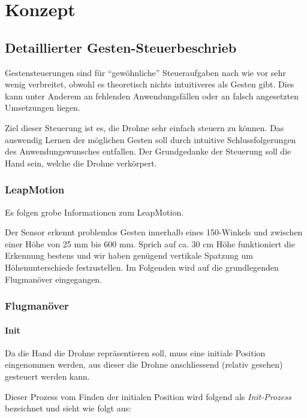 \chapter{Konzept}

\section{Detaillierter Gesten-Steuerbeschrieb}

Gestensteuerungen sind für "`gewöhnliche"' Steueraufgaben nach wie vor sehr wenig verbreitet, obwohl es theoretisch nichts intuitiveres als Gesten gibt.
Dies kann unter Anderem an fehlenden Anwendungsfällen oder an falsch angesetzten Umsetzungen liegen.

Ziel dieser Steuerung ist es, die Drohne sehr einfach steuern zu können.
Das auswendig Lernen der möglichen Gesten soll durch intuitive Schlussfolgerungen des Anwendungswunsches entfallen.
Der Grundgedanke der Steuerung soll die Hand sein, welche die Drohne verkörpert.

\subsection{LeapMotion}
Es folgen grobe Informationen zum LeapMotion.

Der Sensor erkennt problemlos Gesten innerhalb eines 150\textdegree-Winkels und zwischen einer Höhe von 25 mm bis 600 mm.
Sprich auf ca. 30 cm Höhe funktioniert die Erkennung bestens und wir haben genügend vertikale Spatzung um Höhenunterschiede festzustellen.
Im Folgenden wird auf die grundlegenden Flugmanöver eingegangen.


\subsection{Flugmanöver}

\subsubsection{Init}

Da die Hand die Drohne repräsentieren soll, muss eine initiale Position eingenommen werden, aus dieser die Drohne anschliessend (relativ gesehen) gesteuert werden kann.

Dieser Prozess vom Finden der initialen Position wird folgend als \textit{Init-Prozess} bezeichnet und sieht wie folgt aus:


